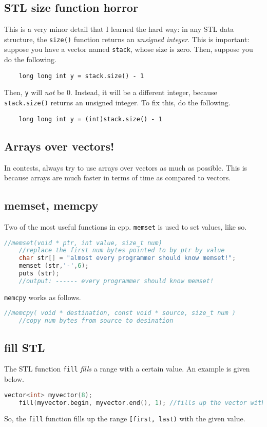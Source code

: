 \documentclass[12pt,a4paper]{amsart}
\numberwithin{equation}{section}
\theoremstyle{definition}
\begin{document}
\subsection{STL size function horror} This is a very minor detail that I learned the hard way: in any STL data structure, the \verb|size()| function returns an \textit{unsigned integer}. This is important: suppose you have a vector named \verb|stack|, whose size is zero. Then, suppose you do the following. 
\begin{verbatim}
    long long int y = stack.size() - 1
\end{verbatim}
Then, \verb|y| will \textit{not} be 0. Instead, it will be a different integer, because \verb|stack.size()| returns an unsigned integer. To fix this, do the following. 
\begin{verbatim}
    long long int y = (int)stack.size() - 1
\end{verbatim}

\subsection{Arrays over vectors!} In contests, always try to use arrays over vectors as much as possible. This is because arrays are much faster in terms of time as compared to vectors. 

\subsection{memset, memcpy} Two of the most useful functions in cpp. \verb|memset| is used to set values, like so. 
\begin{lstlisting}[language=C++]
    //memset(void * ptr, int value, size_t num)
    //replace the first num bytes pointed to by ptr by value 
    char str[] = "almost every programmer should know memset!";
    memset (str,'-',6);
    puts (str);
    //output: ------ every programmer should know memset!
\end{lstlisting}

\verb|memcpy| works as follows. 

\begin{lstlisting}[language=C++]
    //memcpy( void * destination, const void * source, size_t num )
    //copy num bytes from source to desination
\end{lstlisting}

\subsection{fill STL} The STL function \verb|fill| \textit{fills} a range with a certain value. An example is given below. 
\begin{lstlisting}[language=C++]
	vector<int> myvector(8);
	fill(myvector.begin, myvector.end(), 1); //fills up the vector with value 1
\end{lstlisting}
So, the \verb|fill| function fills up the range \verb|[first, last)| with the given value.
\end{document}
